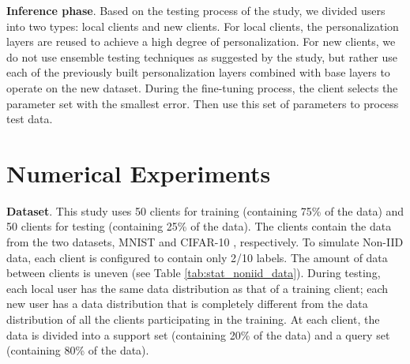 \documentclass[runningheads]{llncs}
\begin{document}
\textbf{Inference phase}. Based on the testing process of the \cite{liang2020think} study, we divided users into two types: local clients and new clients. For local clients, the personalization layers are reused to achieve a high degree of personalization. For new clients, we do not use ensemble testing techniques as suggested by the \cite{liang2020think} study, but rather use each of the previously built personalization layers combined with base layers to operate on the new dataset. During the fine-tuning process, the client selects the parameter set with the smallest error. Then use this set of parameters to process test data.

\section{Numerical Experiments}

\textbf{Dataset}. This study uses 50 clients for training (containing 75\% of the data) and 50 clients for testing (containing 25\% of the data). The clients contain the data from the two datasets, MNIST \cite{deng2012mnist} and CIFAR-10 \cite{krizhevsky2009learning}, respectively. To simulate Non-IID data, each client is configured to contain only 2/10 labels. The amount of data between clients is uneven (see Table \ref{tab:stat_noniid_data}). During testing, each local user has the same data distribution as that of a training client; each new user has a data distribution that is completely different from the data distribution of all the clients participating in the training. At each client, the data is divided into a support set (containing 20\% of the data) and a query set (containing 80\% of the data).

\end{document}
